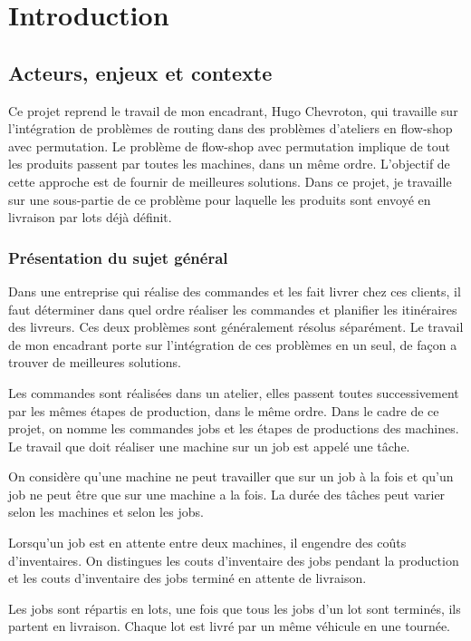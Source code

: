 \chapter{Introduction}

\section{Acteurs, enjeux et contexte}
Ce projet reprend le travail de mon encadrant, Hugo Chevroton, 
    qui travaille sur l'intégration de problèmes de routing dans des problèmes d'ateliers en flow-shop avec permutation.
Le problème de flow-shop avec permutation implique de tout les produits passent par toutes les machines, dans un même ordre.
  L'objectif de cette approche est de fournir de meilleures solutions.
Dans ce projet, je travaille sur une sous-partie de ce problème pour laquelle les produits sont envoyé en livraison par lots déjà définit.

\subsection{Présentation du sujet général}
Dans une entreprise qui réalise des commandes et les fait livrer chez ces clients,
    il faut déterminer dans quel ordre réaliser les commandes et planifier les itinéraires des livreurs.
Ces deux problèmes sont généralement résolus séparément.
Le travail de mon encadrant porte sur l'intégration de ces problèmes en un seul,
     de façon a trouver de meilleures solutions.

Les commandes sont réalisées dans un atelier, 
    elles passent toutes successivement par les mêmes étapes de production, dans le même ordre.
Dans le cadre de ce projet, on nomme les commandes jobs et les étapes de productions des machines.
Le travail que doit réaliser une machine sur un job est appelé une tâche.

On considère qu'une machine ne peut travailler que sur un job à la fois 
    et qu'un job ne peut être que sur une machine a la fois.
La durée des tâches peut varier selon les machines et selon les jobs.

Lorsqu'un job est en attente entre deux machines, il engendre des coûts d'inventaires.
On distingues les couts d'inventaire des jobs pendant la production 
    et les couts d'inventaire des jobs terminé en attente de livraison.

Les jobs sont répartis en lots, une fois que tous les jobs d'un lot sont terminés, ils partent en livraison.
Chaque lot est livré par un même véhicule en une tournée.

